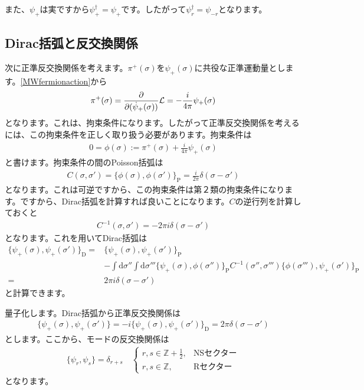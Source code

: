 \documentclass[report,paper=a4, fontsize=12pt, line_length=16cm, number_of_lines=33,dvipdfmx]{jlreq}
\numberwithin{equation}{chapter}
\numberwithin{equation}{section}
\newcommand{\Zb}{\mathbb{Z}}
\newcommand{\Lcal}{\mathcal{L}}
\newcommand{\pbk}[1]{\{#1\}_{\mathrm{P}}}
\newcommand{\dbk}[1]{\{#1\}_{\mathrm{D}}}
\newcommand{\di}{\mathrm{d}}
\begin{document}
また、$\psi_{+}$は実ですから$\psi_{+}^{\dag}=\psi_{+}$です。したがって$\psi_{r}^{\dag}=\psi_{-r}$となります。

\subsection{Dirac括弧と反交換関係}
次に正準反交換関係を考えます。$\pi^{+}(\sigma)$を$\psi_{+}(\sigma)$に共役な正準運動量とします。\eqref{MWfermionaction}から
\begin{align}
  \pi^{+}(\sigma)=\pdv{(\dot{\psi}_{+}(\sigma))}\Lcal=-\frac{i}{4\pi}\psi_{+}(\sigma)
\end{align}
となります。これは、拘束条件になります。したがって正準反交換関係を考えるには、この拘束条件を正しく取り扱う必要があります。拘束条件は
\begin{align}
  0=\phi(\sigma):=\pi^{+}(\sigma)+\frac{i}{4\pi}\psi_{+}(\sigma)
\end{align}
と書けます。拘束条件の間のPoisson括弧は
\begin{align}
  C(\sigma,\sigma')=\pbk{\phi(\sigma),\phi(\sigma')}=\frac{i}{2\pi}\delta(\sigma-\sigma')
\end{align}
となります。これは可逆ですから、この拘束条件は第２類の拘束条件になります。ですから、Dirac括弧を計算すれば良いことになります。$C$の逆行列を計算しておくと
\begin{align}
  C^{-1}(\sigma,\sigma')=-2\pi i\delta(\sigma-\sigma')
\end{align}
となります。これを用いてDirac括弧は
\begin{align}
  \dbk{\psi_{+}(\sigma),\psi_{+}(\sigma')}
  =&\pbk{\psi_{+}(\sigma),\psi_{+}(\sigma')}\nonumber \\
   &-\int \di\sigma''\int \di \sigma'''
   \pbk{\psi_{+}(\sigma),\phi(\sigma'')}C^{-1}(\sigma'',\sigma''')\pbk{\phi(\sigma'''),\psi_{+}(\sigma')}\nonumber\\
   =&2\pi i \delta(\sigma-\sigma')
\end{align}
と計算できます。

量子化します。Dirac括弧から正準反交換関係は
\begin{align}
  \{\psi_{+}(\sigma),\psi_{+}(\sigma')\}
  =-i\dbk{\psi_{+}(\sigma),\psi_{+}(\sigma')}
  =2\pi \delta(\sigma-\sigma')
\end{align}
とします。ここから、モードの反交換関係は
\begin{align}
  \{\psi_{r},\psi_{s}\}=\delta_{r+s}\quad
  \begin{cases}
    r,s\in \Zb+\frac12,&\text{NSセクター}\\
    r,s\in \Zb,&\text{Rセクター}
  \end{cases}
  \label{anticomm}
\end{align}
となります。
\end{document}

